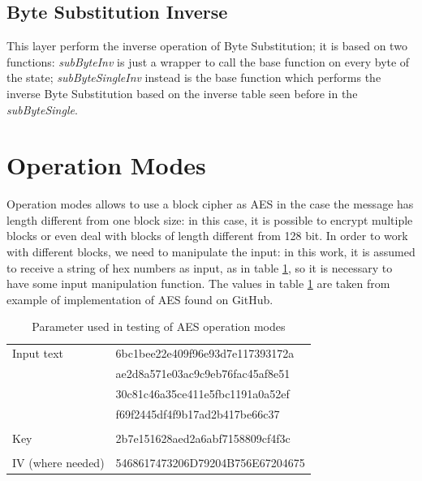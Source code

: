 \documentclass{article}
\begin{document}
\subsection{Byte Substitution Inverse}

This layer perform the inverse operation of Byte Substitution; it is based on two functions: \textit{subByteInv} is just a wrapper to call the base function on every byte of the state; \textit{subByteSingleInv} instead is the base function which performs the inverse Byte Substitution based on the inverse table seen before in the \textit{subByteSingle}.
 

\section{Operation Modes}

Operation modes allows to use a block cipher as AES in the case the message has length different from one block size: in this case, it is possible to encrypt multiple blocks or even deal with blocks of length different from 128 bit. In order to work with different blocks, we need to manipulate the input: in this work, it is assumed to receive a string of hex numbers as input, as in table \ref{tab:AESparameter}, so it is necessary to have some input manipulation function.\newline
The values in table \ref{tab:AESparameter} are taken from example of implementation of AES found on GitHub.

\begin{table}[H]
\begin{center}
\begin{tabular}{ll}
Input text &  6bc1bee22e409f96e93d7e117393172a\\
	      &   ae2d8a571e03ac9c9eb76fac45af8e51\\
	      &   30c81c46a35ce411e5fbc1191a0a52ef\\
	      &   f69f2445df4f9b17ad2b417be66c37 \\
\\
Key & 2b7e151628aed2a6abf7158809cf4f3c\\
\\
IV (where needed) & 5468617473206D79204B756E67204675
\end{tabular}
\caption{Parameter used in testing of AES operation modes}
\label{tab:AESparameter}
\end{center}
\end{table}
\end{document}
